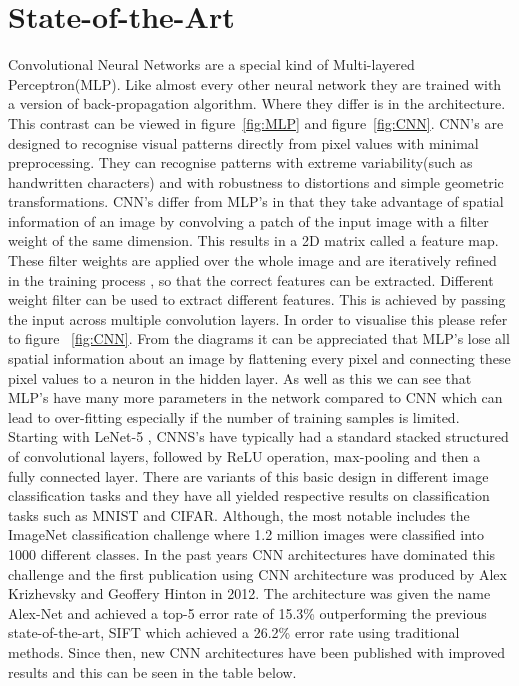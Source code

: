 \section{State-of-the-Art}

Convolutional Neural Networks are a special kind of Multi-layered Perceptron(MLP). Like almost every other neural network they are trained with a version of back-propagation algorithm. Where they differ is in the architecture. This contrast can be viewed in figure~\ref{fig:MLP} and figure~\ref{fig:CNN}. CNN's are designed to recognise visual patterns directly from pixel values with minimal preprocessing. They can recognise patterns with extreme variability(such as handwritten characters) and with robustness to distortions and simple geometric transformations. \cite{lecun1989backpropagation}
CNN's differ from MLP's in that they take advantage of spatial information of an image by convolving a patch of the input image with a filter weight of the same dimension. This results in a 2D matrix called a feature map. These filter weights are applied over the whole image and are iteratively refined in the training process , so that the correct features can be extracted. Different weight filter can be used to extract different features. This is achieved by passing the input across multiple convolution layers. In order to visualise this please refer to figure ~\ref{fig:CNN}. From the diagrams it can be appreciated that MLP's lose all spatial information about an image by flattening every pixel and connecting these pixel values to a neuron in the hidden layer. As well as this we can see that MLP's have many more parameters in the network compared to CNN which can lead to over-fitting especially if the number of training samples is limited. \cite{szegedy2015going}
Starting with LeNet-5 , CNNS's have typically had a standard stacked structured of convolutional layers, followed by ReLU operation, max-pooling and then a fully connected layer. There are variants of this basic design in different image classification tasks and they have all yielded respective results on classification tasks such as MNIST and CIFAR. Although, the most notable includes the ImageNet classification challenge where 1.2 million images were classified into 1000 different classes. In the past years CNN architectures have dominated this challenge and the first publication using CNN architecture was produced by Alex Krizhevsky and Geoffery Hinton in 2012\cite{krizhevsky2012imagenet}. The architecture was given the name Alex-Net and achieved a top-5 error rate of 15.3\% outperforming the previous state-of-the-art, SIFT \cite{lowe2004distinctive} which achieved a 26.2\% error rate using traditional methods. Since then, new CNN architectures have been published with improved results and this can be seen in the table below. 

